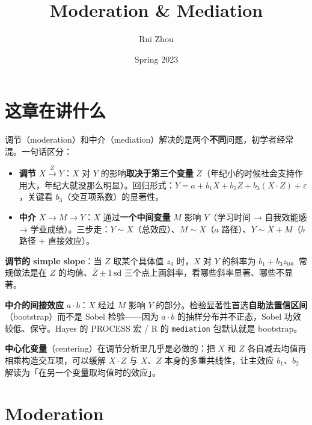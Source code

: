 \documentclass[
]{ctexart}
\title{Moderation \& Mediation}
\author{Rui Zhou \and Spring 2023}
\date{}
\providecommand{\tightlist}{%
  \setlength{\itemsep}{0pt}\setlength{\parskip}{0pt}}
\begin{document}
\maketitle

{
\setcounter{tocdepth}{2}
\tableofcontents
}
\hypertarget{ux8fd9ux7ae0ux5728ux8bb2ux4ec0ux4e48}{%
\section{这章在讲什么}\label{ux8fd9ux7ae0ux5728ux8bb2ux4ec0ux4e48}}

调节（moderation）和中介（mediation）解决的是两个\textbf{不同}问题，初学者经常混。一句话区分：

\begin{itemize}
\tightlist
\item
  \textbf{调节} \(X \xrightarrow{Z} Y\)：\(X\) 对 \(Y\)
  的影响\textbf{取决于第三个变量}
  \(Z\)（年纪小的时候社会支持作用大，年纪大就没那么明显）。回归形式：\(Y = a + b_1 X + b_2 Z + b_3 (X \cdot Z) + \varepsilon\)，关键看
  \(b_3\)（交互项系数）的显著性。
\item
  \textbf{中介} \(X \to M \to Y\)：\(X\) 通过\textbf{一个中间变量} \(M\)
  影响 \(Y\)（学习时间 → 自我效能感 →
  学业成绩）。三步走：\(Y \sim X\)（总效应）、\(M \sim X\)（\(a\)
  路径）、\(Y \sim X + M\)（\(b\) 路径 + 直接效应）。
\end{itemize}

\begin{concept}[两个核心数学量]
\textbf{调节的 simple slope}：当 $Z$ 取某个具体值 $z_0$ 时，$X$ 对 $Y$ 的斜率为 $b_1 + b_3 z_0$。常规做法是在 $Z$ 的均值、$\bar Z \pm 1\,\mathrm{sd}$ 三个点上画斜率，看哪些斜率显著、哪些不显著。

\textbf{中介的间接效应} $a \cdot b$：$X$ 经过 $M$ 影响 $Y$ 的部分。检验显著性首选\textbf{自助法置信区间}（bootstrap）而不是 Sobel 检验——因为 $a \cdot b$ 的抽样分布并不正态，Sobel 功效较低、保守。Hayes 的 PROCESS 宏 / R 的 \texttt{mediation} 包默认就是 bootstrap。
\end{concept}

\textbf{中心化变量}（centering）在调节分析里几乎是必做的：把 \(X\) 和
\(Z\) 各自减去均值再相乘构造交互项，可以缓解 \(X \cdot Z\) 与
\(X\)、\(Z\) 本身的多重共线性，让主效应 \(b_1\)、\(b_2\)
解读为「在另一个变量取均值时的效应」。

\hypertarget{moderation}{%
\section{Moderation}\label{moderation}}
\end{document}
